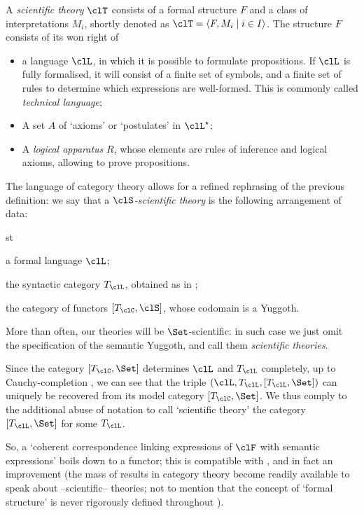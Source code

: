 \begin{definition*}
  A \emph{scientific theory} $\clT$ consists of a formal structure $F$ and a class of interpretations $M_i$, shortly denoted as $\clT=\langle F,M_i\mid i\in I\rangle$. The structure $F$ consists of its won right of
  \begin{itemize}
    \item a language $\clL$, in which it is possible to formulate propositions. If $\clL$ is fully formalised, it will consist of a finite set of symbols, and a finite set of rules to determine which expressions are well-formed. This is commonly called \emph{technical language};
    \item A set $A$ of `axioms' or `postulates' in $\clL^\star$;
    \item A \emph{logical apparatus} $R$, whose elements are rules of inference and logical axioms, allowing to prove propositions.
  \end{itemize}
\end{definition*}
The language of category theory allows for a refined rephrasing of the previous definition: we say that a \emph{$\clS$-scientific theory} is the following arrangement of data:
\begin{enumtag}{st}
  \item a formal language $\clL$;
  \item the syntactic category $T_\clL$, obtained as in \cite[II.11]{lambek1988introduction};
  \item the category of functors $[T_\clC, \clS]$, whose codomain is a Yuggoth.
\end{enumtag}
More than often, our theories will be $\Set$-scientific: in such case we just omit the specification of the semantic Yuggoth, and call them \emph{scientific theories}.

Since the category $[T_\clC, \Set]$ determines $\clL$ and $T_\clL$ completely, up to Cauchy-completion \cite{borceuso-cauchy}, we can see that the triple $(\clL, T_\clL, [T_\clL,\Set])$ can uniquely be recovered from its model category $[T_\clC, \Set]$. We thus comply to the additional abuse of notation to call `scientific theory' the category $[T_\clL,\Set]$ for some $T_\clL$.

So, a `coherent correspondence linking expressions of $\clF$ with semantic expressions' boils down to a functor; this is compatible with \cite[2.1]{biologia}, and in fact an improvement (the mass of results in category theory become readily available to speak about --scientific-- theories; not to mention that the concept of `formal structure' is never rigorously defined throughout \cite{biologia}).

